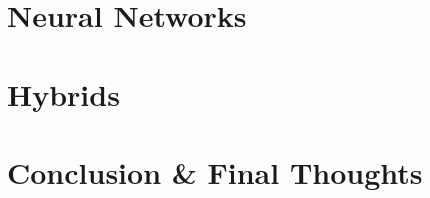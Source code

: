 \documentclass{report}
\begin{document}
\section{Neural Networks}

\section{Hybrids}


\section{Conclusion \& Final Thoughts}



\end{document}
